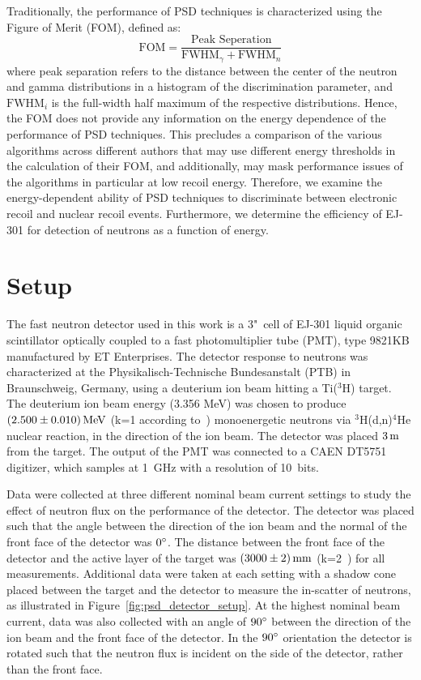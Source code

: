 Traditionally, the performance of PSD techniques is characterized using the Figure of Merit (FOM), defined as:
\begin{equation}\label{eq:FOM}
\text{FOM} = \frac{\text{Peak Seperation}}{\text{FWHM}_\gamma+\text{FWHM}_n}
\end{equation}
where peak separation refers to the distance between the center of the neutron and gamma distributions in a histogram of the discrimination parameter, and $\text{FWHM}_i$ is the full-width half maximum of the respective distributions. Hence, the FOM does not provide any information on the energy dependence of the performance of PSD techniques. This precludes a comparison of the various algorithms across different authors that may use different energy thresholds in the calculation of their FOM, and additionally, may mask performance issues of the algorithms in particular at low recoil energy. Therefore, we examine the energy-dependent ability of PSD techniques to discriminate between electronic recoil and nuclear recoil events. Furthermore, we determine the efficiency of EJ-301 for detection of neutrons as a function of energy.

\section{Setup}

The fast neutron detector used in this work is a 3"~cell of EJ-301 liquid organic scintillator optically coupled to a fast photomultiplier tube (PMT), type 9821KB manufactured by ET Enterprises. The detector response to neutrons was characterized at the Physikalisch-Technische Bundesanstalt (PTB) in Braunschweig, Germany,  using a deuterium ion beam hitting a Ti($^3$H) target. The deuterium ion beam energy (3.356 MeV) was chosen to produce $(2.500\pm 0.010)\,\mathrm{MeV}$ (k=1 according to~\cite{GUM}) monoenergetic neutrons via $^{3}$H(d,n)$^{4}$He nuclear reaction, in the direction of the ion beam. The detector was placed $3\,\mathrm{m}$ from the target. The output of the PMT was connected to a CAEN DT5751 digitizer, which samples at 1~GHz with a resolution of 10~bits.

Data were collected at three different nominal beam current settings to study the effect of neutron flux on the performance of the detector. The detector was placed such that the angle between the direction of the ion beam and the normal of the front face of the detector was $0{}^{\circ}$. The distance between the front face of the detector and the active layer of the target was $(3000\pm 2)\,\mathrm{mm}$ (k=2~\cite{GUM}) for all measurements. Additional data were taken at each setting with a shadow cone placed between the target and the detector to measure the in-scatter of neutrons, as illustrated in Figure~\ref{fig:psd_detector_setup}. At the highest nominal beam current, data was also collected with an angle of $90{}^{\circ}$ between the direction of the ion beam and the front face of the detector. In the $90{}^{\circ}$ orientation the detector is rotated such that the neutron flux is incident on the side of the detector, rather than the front face.

